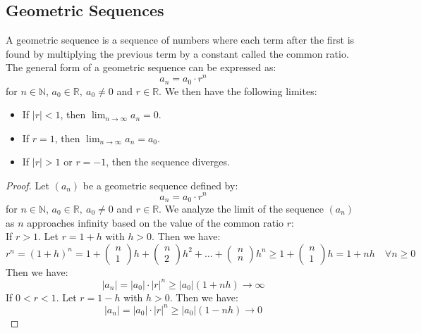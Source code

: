 \subsection{Geometric Sequences}
\begin{definition}
    A geometric sequence is a sequence of numbers where each term after the first is found by multiplying the previous term by a constant called the common ratio. The general form of a geometric sequence can be expressed as:
    \[
        a_n = a_0 \cdot r^{n}
    \]
    for \( n \in \mathbb{N} \), \( a_0 \in \mathbb{R}, \ a_0 \neq 0\) and \( r \in \mathbb{R} \). We then have the following limites:
    \begin{itemize}[itemsep=1pt,label=$\circ$]
        \item If \( |r| < 1 \), then \( \lim_{n \to \infty} a_n = 0 \).
        \item If \( r = 1 \), then \( \lim_{n \to \infty} a_n = a_0 \).
        \item If $|r| > 1$ or \( r = -1 \), then the sequence diverges.
    \end{itemize}
\end{definition}
\begin{proof}
    Let \( (a_n) \) be a geometric sequence defined by:
    \[
        a_n = a_0 \cdot r^{n}
    \]
    for \( n \in \mathbb{N} \), \( a_0 \in \mathbb{R}, \ a_0 \neq 0\) and \( r \in \mathbb{R} \). We analyze the limit of the sequence \( (a_n) \) as \( n \) approaches infinity based on the value of the common ratio \( r \): \\
    If $r > 1$. Let $r = 1 + h$ with $h > 0$. Then we have:
    \[ r^n = (1 + h)^n = 1 + \begin{pmatrix}
n \\ 1
\end{pmatrix} h + \begin{pmatrix}
n \\ 2
\end{pmatrix} h^2 + \ldots + \begin{pmatrix}
n \\ n
\end{pmatrix} h^n \geq 1 + \begin{pmatrix}n \\ 1
    \end{pmatrix} h  = 1 + nh \quad \forall n \geq 0\]
    Then we have:
    \[ |a_n| = |a_0| \cdot |r|^n \geq |a_0| (1 + nh) \to \infty \]
    If $0 < r < 1$. Let $r = 1 - h$ with $h > 0$. Then we have:
    \[ |a_n| = |a_0| \cdot |r|^n \geq |a_0| (1 - nh) \to 0 \]

\end{proof}


